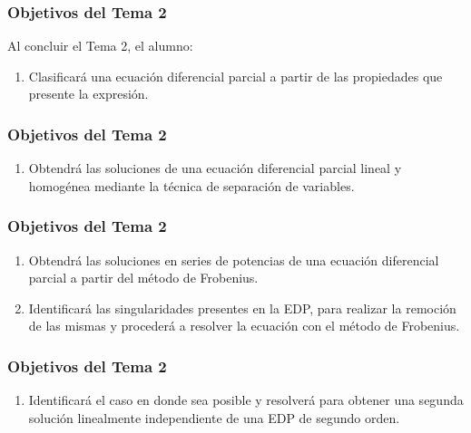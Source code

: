 \documentclass[12pt]{beamer}
\begin{document}
\begin{frame}
\frametitle{Objetivos del Tema 2}
Al concluir el Tema 2, el alumno:
\begin{enumerate}
\item Clasificará una ecuación diferencial parcial a partir de las propiedades que presente la expresión.
\seti
\end{enumerate}
\end{frame}
\begin{frame}
\frametitle{Objetivos del Tema 2}
\begin{enumerate}
\conti
\item Obtendrá las soluciones de una ecuación diferencial parcial lineal y homogénea mediante la técnica de separación de variables.
\seti
\end{enumerate}
\end{frame}
\begin{frame}
\frametitle{Objetivos del Tema 2}
\begin{enumerate}[<+->]
\conti
\item Obtendrá las soluciones en series de potencias de una ecuación diferencial parcial a partir del método de Frobenius.
\item Identificará las singularidades presentes en la EDP, para realizar la remoción de las mismas y procederá a resolver la ecuación con el método de Frobenius.
\seti
\end{enumerate}
\end{frame}
\begin{frame}
\frametitle{Objetivos del Tema 2}
\begin{enumerate}
\conti
\item Identificará el caso en donde sea posible y resolverá para obtener una segunda solución linealmente independiente de una EDP de segundo orden.
\seti
\end{enumerate}
\end{frame}
\end{document}
